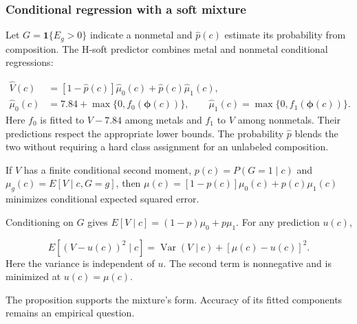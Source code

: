 \subsubsection{Conditional regression with a soft mixture}
Let $G=\mathbf{1}\{E_g>0\}$ indicate a nonmetal and $\widehat p(c)$ estimate its probability from composition. The H-soft predictor combines metal and nonmetal conditional regressions:
\begin{samepage}
\begin{equation}
 \begin{aligned}
 \widehat V(c)&=[1-\widehat p(c)]\widehat\mu_0(c)
                  +\widehat p(c)\widehat\mu_1(c),\\
 \widehat\mu_0(c)&=7.84+\max\{0,f_0(\boldsymbol\phi(c))\},\qquad
 \widehat\mu_1(c)=\max\{0,f_1(\boldsymbol\phi(c))\}.
 \end{aligned}
 \label{eq:mixture}
\end{equation}
\noindent Here $f_0$ is fitted to $V-7.84$ among metals and $f_1$ to $V$ among nonmetals. Their predictions respect the appropriate lower bounds. The probability $\widehat p$ blends the two without requiring a hard class assignment for an unlabeled composition.
\end{samepage}

\begin{proposition}\label{prop:mixture}
If $V$ has a finite conditional second moment, $p(c)=P(G=1\mid c)$ and $\mu_g(c)=E[V\mid c,G=g]$, then $\mu(c)=[1-p(c)]\mu_0(c)+p(c)\mu_1(c)$ minimizes conditional expected squared error.
\end{proposition}
\begin{p1proof}
Conditioning on $G$ gives $E[V\mid c]=(1-p)\mu_0+p\mu_1$. For any prediction $u(c)$,
\begin{samepage}
\begin{equation}
 E[(V-u(c))^2\mid c]
 =\operatorname{Var}(V\mid c)+[\mu(c)-u(c)]^2.
 \label{eq:squared-risk}
\end{equation}
\noindent Here the variance is independent of $u$. The second term is nonnegative and is minimized at $u(c)=\mu(c)$.
\end{samepage}
\end{p1proof}

The proposition supports the mixture's form. Accuracy of its fitted components remains an empirical question.

